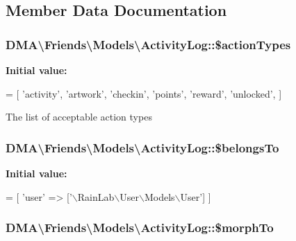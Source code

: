 \subsection{Member Data Documentation}
\hypertarget{classDMA_1_1Friends_1_1Models_1_1ActivityLog_aa60b5fe0e1e7c254827bfa35c69aef9d}{
\subsubsection[{\$action\+Types}]{\setlength{\rightskip}{0pt plus 5cm}D\+M\+A\textbackslash{}\+Friends\textbackslash{}\+Models\textbackslash{}\+Activity\+Log\+::\$action\+Types}}\label{classDMA_1_1Friends_1_1Models_1_1ActivityLog_aa60b5fe0e1e7c254827bfa35c69aef9d}
{\bfseries Initial value\+:}
\begin{DoxyCode}
= [
        \textcolor{stringliteral}{'activity'},
        \textcolor{stringliteral}{'artwork'},
        \textcolor{stringliteral}{'checkin'},
        \textcolor{stringliteral}{'points'},
        \textcolor{stringliteral}{'reward'},
        \textcolor{stringliteral}{'unlocked'},
    ]
\end{DoxyCode}
The list of acceptable action types \hypertarget{classDMA_1_1Friends_1_1Models_1_1ActivityLog_aff637d41ffa73260e1ffc1788f5a98d7}{
\subsubsection[{\$belongs\+To}]{\setlength{\rightskip}{0pt plus 5cm}D\+M\+A\textbackslash{}\+Friends\textbackslash{}\+Models\textbackslash{}\+Activity\+Log\+::\$belongs\+To}}\label{classDMA_1_1Friends_1_1Models_1_1ActivityLog_aff637d41ffa73260e1ffc1788f5a98d7}
{\bfseries Initial value\+:}
\begin{DoxyCode}
= [
        \textcolor{stringliteral}{'user'} => [\textcolor{stringliteral}{'\(\backslash\)RainLab\(\backslash\)User\(\backslash\)Models\(\backslash\)User'}]
    ]
\end{DoxyCode}
\hypertarget{classDMA_1_1Friends_1_1Models_1_1ActivityLog_afaa82849e3e93bf41ac948658ac652ff}{
\subsubsection[{\$morph\+To}]{\setlength{\rightskip}{0pt plus 5cm}D\+M\+A\textbackslash{}\+Friends\textbackslash{}\+Models\textbackslash{}\+Activity\+Log\+::\$morph\+To}}\label{classDMA_1_1Friends_1_1Models_1_1ActivityLog_afaa82849e3e93bf41ac948658ac652ff}
